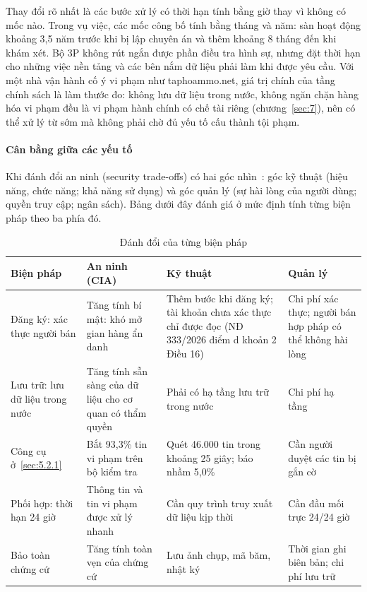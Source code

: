 Thay đổi rõ nhất là các bước xử lý có thời hạn tính bằng giờ thay vì không có mốc nào. Trong vụ việc, các mốc công bố tính bằng tháng và năm: sàn hoạt động khoảng 3,5 năm trước khi bị lập chuyên án và thêm khoảng 8 tháng đến khi khám xét. Bộ 3P không rút ngắn được phần điều tra hình sự, nhưng đặt thời hạn cho những việc nền tảng và các bên nắm dữ liệu phải làm khi được yêu cầu. Với một nhà vận hành cố ý vi phạm như taphoammo.net, giá trị chính của tầng chính sách là làm thước đo: không lưu dữ liệu trong nước, không ngăn chặn hàng hóa vi phạm đều là vi phạm hành chính có chế tài riêng (chương~\ref{sec:7}), nên có thể xử lý từ sớm mà không phải chờ đủ yếu tố cấu thành tội phạm.

\paragraph{Cân bằng giữa các yếu tố}

Khi đánh đổi an ninh (security trade-offs) có hai góc nhìn~\cite{lpsc-l3}: góc kỹ thuật (hiệu năng, chức năng; khả năng sử dụng) và góc quản lý (sự hài lòng của người dùng; quyền truy cập; ngân sách). Bảng dưới đây đánh giá ở mức định tính từng biện pháp theo ba phía đó.

{\small{}
\begin{table}[H]
\centering
\caption{Đánh đổi của từng biện pháp}\label{tab:6.tradeoff}
\begin{tabularx}{\textwidth}{>{\hsize=0.75\hsize\raggedright\arraybackslash}X>{\hsize=1.05\hsize\raggedright\arraybackslash}X>{\hsize=1.1\hsize\raggedright\arraybackslash}X>{\hsize=1.1\hsize\raggedright\arraybackslash}X}
\toprule
\textbf{Biện pháp} & \textbf{An ninh (CIA)} & \textbf{Kỹ thuật} & \textbf{Quản lý} \\
\midrule
Đăng ký: xác thực người bán & Tăng tính bí mật: khó mở gian hàng ẩn danh & Thêm bước khi đăng ký; tài khoản chưa xác thực chỉ được đọc (NĐ 333/2026 điểm d khoản 2 Điều 16) & Chi phí xác thực; người bán hợp pháp có thể không hài lòng \\
Lưu trữ: lưu dữ liệu trong nước & Tăng tính sẵn sàng của dữ liệu cho cơ quan có thẩm quyền & Phải có hạ tầng lưu trữ trong nước & Chi phí hạ tầng \\
Công cụ ở~\ref{sec:5.2.1} & Bắt 93,3\% tin vi phạm trên bộ kiểm tra & Quét 46.000 tin trong khoảng 25 giây; báo nhầm 5,0\% & Cần người duyệt các tin bị gắn cờ \\
Phối hợp: thời hạn 24 giờ & Thông tin và tin vi phạm được xử lý nhanh & Cần quy trình truy xuất dữ liệu kịp thời & Cần đầu mối trực 24/24 giờ \\
Bảo toàn chứng cứ & Tăng tính toàn vẹn của chứng cứ & Lưu ảnh chụp, mã băm, nhật ký & Thời gian ghi biên bản; chi phí lưu trữ \\
\bottomrule
\end{tabularx}
\end{table}}

